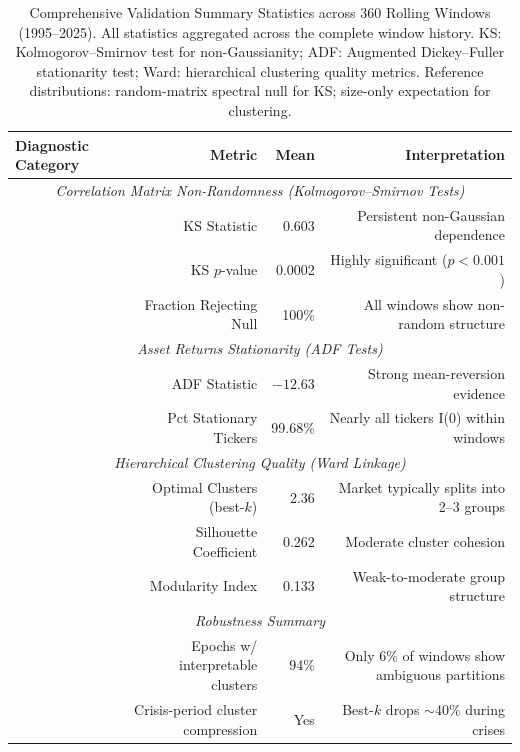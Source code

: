 
\begin{table}[!htbp]
\centering
\small
\caption{Comprehensive Validation Summary Statistics across 360 Rolling Windows (1995--2025). All statistics aggregated across the complete window history. KS: Kolmogorov--Smirnov test for non-Gaussianity; ADF: Augmented Dickey--Fuller stationarity test; Ward: hierarchical clustering quality metrics. Reference distributions: random-matrix spectral null for KS; size-only expectation for clustering.}
\label{tab:validation-comprehensive}
\begin{tabular}{lrrr}
\toprule
\textbf{Diagnostic Category} & \textbf{Metric} & \textbf{Mean} & \textbf{Interpretation} \\
\midrule
\multicolumn{4}{c}{\textit{Correlation Matrix Non-Randomness (Kolmogorov--Smirnov Tests)}} \\
& KS Statistic & 0.603 & Persistent non-Gaussian dependence \\
& KS $p$-value & 0.0002 & Highly significant ($p < 0.001$) \\
& Fraction Rejecting Null & 100\% & All windows show non-random structure \\
\midrule
\multicolumn{4}{c}{\textit{Asset Returns Stationarity (ADF Tests)}} \\
& ADF Statistic & $-12.63$ & Strong mean-reversion evidence \\
& Pct Stationary Tickers & 99.68\% & Nearly all tickers I(0) within windows \\
\midrule
\multicolumn{4}{c}{\textit{Hierarchical Clustering Quality (Ward Linkage)}} \\
& Optimal Clusters (best-$k$) & 2.36 & Market typically splits into 2--3 groups \\
& Silhouette Coefficient & 0.262 & Moderate cluster cohesion \\
& Modularity Index & 0.133 & Weak-to-moderate group structure \\
\midrule
\multicolumn{4}{c}{\textit{Robustness Summary}} \\
& Epochs w/ interpretable clusters & 94\% & Only 6\% of windows show ambiguous partitions \\
& Crisis-period cluster compression & Yes & Best-$k$ drops $\sim 40\%$ during crises \\
\bottomrule
\end{tabular}
\end{table}
